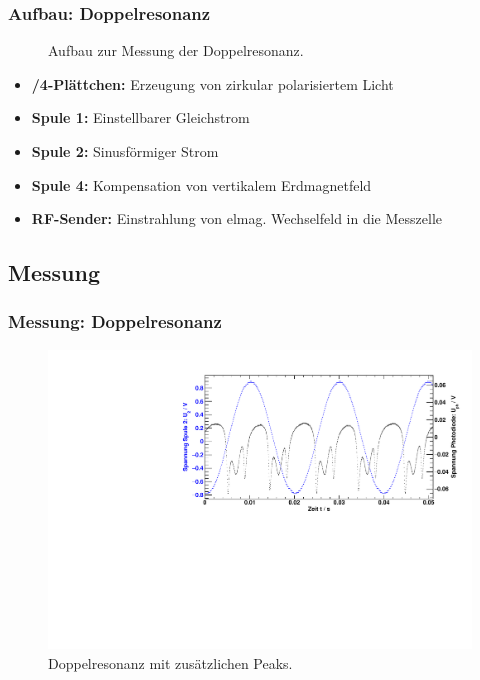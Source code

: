\begin{frame}
\frametitle{Aufbau: Doppelresonanz}


\begin{figure}
    \centering
    \def\svgwidth{\textwidth}
    
    \caption{Aufbau zur Messung der Doppelresonanz.}
\end{figure}

\begin{itemize}
  \item \textbf{\textlambda/4-Plättchen:} Erzeugung von zirkular polarisiertem Licht
  \item \textbf{Spule 1:} Einstellbarer Gleichstrom
  \item \textbf{Spule 2:} Sinusförmiger Strom
  \item \textbf{Spule 4:} Kompensation von vertikalem Erdmagnetfeld
  \item \textbf{RF-Sender:} Einstrahlung von elmag. Wechselfeld in die Messzelle
\end{itemize}

\end{frame}

\subsection{Messung}

\begin{frame}
\frametitle{Messung: Doppelresonanz}
\begin{figure}
    \begin{center}
        \includegraphics[width=\textwidth]{../img/06.pdf}
        \caption{Doppelresonanz mit zusätzlichen Peaks.}
        \label{img:dehmeltrf}
    \end{center}
\end{figure}
\end{frame}


